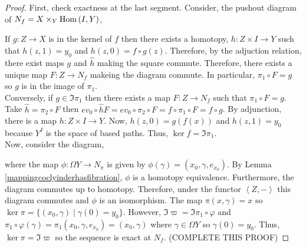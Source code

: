 \documentclass[12pt]{extarticle}
\begin{document}
\begin{proof}
First, check exactness at the last segment. Consider, the pushout diagram of $N_f = X \times_Y \mathrm{Hom}\left( I, Y \right)$,
 \begin{center}
\end{center} 
If $g : Z \to X$ is in the kernel of $f$ then there exists a homotopy, $h : Z \times I \to Y$ such that $h(z, 1) = y_0$ and $h(z, 0) = f \circ g(z)$. Therefore, by the adjuction relation, there exist maps $g$ and $\hat{h}$ making the square commute. Therefore, there exists a unique map $F : Z \to N_f$ makeing the diagram commute. In particular, $\pi_1 \circ F = g$ so $g$ is in the image of $\pi_1$.\bigskip \\
Conversely, if $g \in \Im{\pi_1}$ then there exists a map $F : Z \to N_f$ such that $\pi_1 \circ F = g$. Take $\hat{h} = \pi_2 \circ F$ then $ev_0 \circ \hat{h} F = ev_0 \circ \pi_2 \circ F = f \circ \pi_1 \circ F = f \circ g$. By adjunction, there is a map $h : Z \times I \to Y$. Now, $h(z,0) = g(f(x))$ and $h(z, 1) = y_0$ because $Y^I$ is the space of based paths. Thus, $\ker{f} = \Im{\pi_1}$. \bigskip \\
Now, consider the diagram, 
\begin{center}
\end{center}   
where the map $\phi : \Omega Y \to N_\pi$ is given by $\phi(\gamma) = (x_0, \gamma, e_{x_0})$. By Lemma \ref{mappingcoclyinderhasfibration}, $\phi$ is a homotopy equivalence. Furthermore, the diagram commutes up to homotopy. Therefore, under the functor $\left< Z, - \right>$ this diagram commutes and $\phi$ is an isomorphism. The map $\pi(x, \gamma) = x$ so $\ker{\pi} = \{(x_0, \gamma) \mid \gamma(0) = y_0\}$. However, $\Im{\varpi} = \Im{\pi_1 \circ \varphi}$ and $\pi_1 \circ \varphi(\gamma) = \pi_1(x_0, \gamma, e_{x_0}) = (x_0, \gamma)$ where $\gamma \in \Omega Y$ so $\gamma(0) = y_0$. Thus, $\ker{\pi} = \Im{\varpi}$ so the sequence is exact at $N_f$. (COMPLETE THIS PROOF) 
\end{proof}
\end{document}
